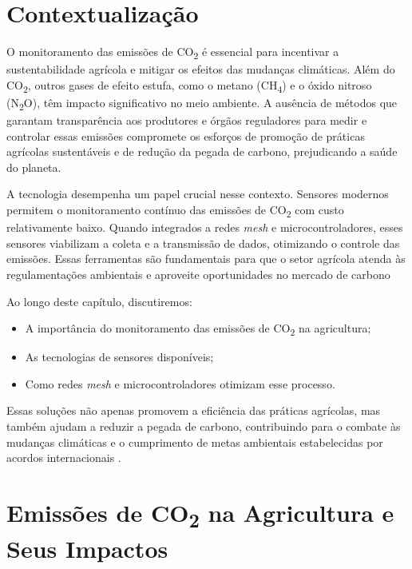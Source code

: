 \section{Contextualização}

O monitoramento das emissões de CO\textsubscript{2} é essencial para incentivar a sustentabilidade agrícola e mitigar os efeitos das mudanças climáticas. Além do CO\textsubscript{2}, outros gases de efeito estufa, como o metano (CH\textsubscript{4}) e o óxido nitroso (N\textsubscript{2}O), têm impacto significativo no meio ambiente. A ausência de métodos que garantam transparência aos produtores e órgãos reguladores para medir e controlar essas emissões compromete os esforços de promoção de práticas agrícolas sustentáveis e de redução da pegada de carbono, prejudicando a saúde do planeta.

A tecnologia desempenha um papel crucial nesse contexto. Sensores modernos permitem o monitoramento contínuo das emissões de CO\textsubscript{2} com custo relativamente baixo. Quando integrados a redes \emph{mesh} e microcontroladores, esses sensores viabilizam a coleta e a transmissão de dados, otimizando o controle das emissões. Essas ferramentas são fundamentais para que o setor agrícola atenda às regulamentações ambientais e aproveite oportunidades no mercado de carbono \cite{inpe23, mma21} 

Ao longo deste capítulo, discutiremos:

\begin{itemize}
    \item A importância do monitoramento das emissões de CO\textsubscript{2} na agricultura;
    \item As tecnologias de sensores disponíveis;
    \item Como redes \emph{mesh} e microcontroladores otimizam esse processo.
\end{itemize}

Essas soluções não apenas promovem a eficiência das práticas agrícolas, mas também ajudam a reduzir a pegada de carbono, contribuindo para o combate às mudanças climáticas e o cumprimento de metas ambientais estabelecidas por acordos internacionais \cite{unfccc2020markets}.

\section[Emissões de CO2 na Agricultura e Seus Impactos]{Emissões de CO\textsubscript{2} na Agricultura e Seus Impactos}

